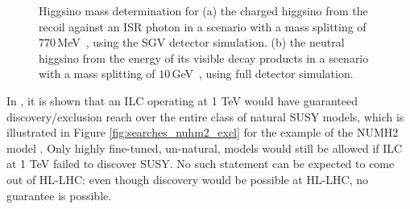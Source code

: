 \begin{figure}[]
  \begin{center}
    \hspace{0.05\linewidth}
  \end{center}
  \caption{\label{fig:searches_higgsinos} Higgsino mass determination for (a) the charged higgsino from the recoil against an ISR photon in a scenario with a mass splitting of $770$\,MeV~\cite{Berggren:2013vfa}, using the SGV detector 
simulation. (b) the neutral higgsino from the energy of its visible decay products in a scenario with a mass splitting of  $10$\,GeV~\cite{Baer:2016new}, using full detector simulation.}
\end{figure}
In \cite{howie-again},
it is shown that an ILC operating at 1 TeV
would have guaranteed discovery/exclusion reach over the
entire class of natural SUSY models, which is illustrated
in Figure \ref{fig:searches_nuhm2_excl} for the example of the NUMH2 model
\cite{Baer:2005bu}.
Only highly fine-tuned, un-natural, models would still be allowed if ILC at 1 TeV
failed to discover SUSY.
No such statement can be expected to come out of HL-LHC:
even though discovery would be possible at HL-LHC,
no guarantee is possible.
